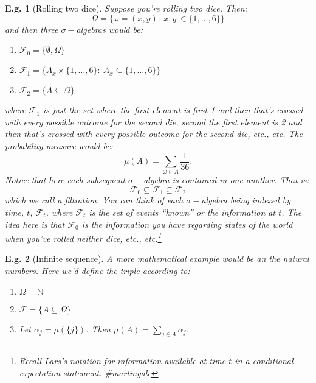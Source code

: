 \documentclass{tufte-book}
\theoremstyle{mytheoremstyle}
\theoremstyle{mylemstyle}
\theoremstyle{mydefstyle}
\newtheorem*{ex}{E.g.}
\begin{document}
\begin{ex}[Rolling two dice] Suppose you're rolling two dice. Then:
	\[\Omega = \{\omega = (x, y):\ x, y\ \in \{1, \dots, 6\}\}\]
and then three \(\sigma-\)algebras would be:
	\begin{enumerate}
		\item \(\mathcal{F}_0 = \{\emptyset, \Omega\}\)
		\item \(\mathcal{F}_1 = \{A_x \times \{1, \dots, 6\}:\ A_x \subseteq \{1, \dots, 6\}\}\)
		\item \(\mathcal{F}_2 = \{A\subseteq \Omega\}\)
	\end{enumerate}
where \(\mathcal{F}_1\) is just the set where the first element is first 1 and then that's crossed with every possible outcome for the second die, second the first element is 2 and then that's crossed with every possible outcome for the second die, etc., etc. The probability measure would be:
	\[\mu(A) = \sum_{\omega \in A} \frac{1}{36} \text{.}\]
Notice that here each subsequent \(\sigma-\)algebra is contained in one another. That is:
	\[\mathcal{F}_0 \subseteq \mathcal{F}_1 \subseteq \mathcal{F}_2\]
which we call a \emph{filtration}. You can think of each \(\sigma-\)algebra being indexed by time, \(t\), \(\mathcal{F}_t\), where \(\mathcal{F}_t\) is the set of events ``known'' or the information at \(t\). The idea here is that \(\mathcal{F}_0\) is the information you have regarding states of the world when you've rolled neither dice, etc., etc.\footnote{Recall Lars's notation for information available at time \(t\) in a conditional expectation statement. \#martingale}
\end{ex}
\begin{ex}[Infinite sequence] A more mathematical example would be an the natural numbers. Here we'd define the triple according to:
	\begin{enumerate}
		\item \(\Omega = \mathbb{N}\)
		\item \(\mathcal{F} = \{A \subseteq \Omega\}\)
		\item Let \(\alpha_j = \mu(\{j\})\). Then \(\mu(A) = \sum_{j \in A} \alpha_j\).
	\end{enumerate}
\end{ex}
\end{document}
